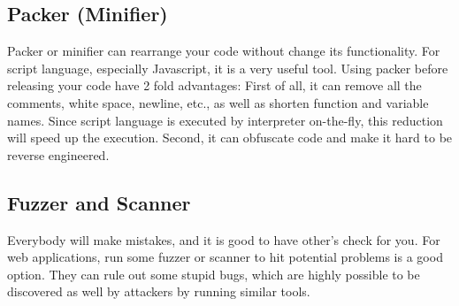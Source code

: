 \documentclass[conference]{IEEEtran}
\begin{document}
\subsection{Packer (Minifier)}
Packer or minifier can rearrange your code without change its
functionality.
For script language, especially Javascript, it is a very useful tool.
Using packer before releasing your code have 2 fold advantages:
First of all, it can remove all the comments, white space, newline, etc.,
as well as
shorten function and
variable names.
Since script language is executed by interpreter on-the-fly, this reduction
will speed up the execution.
Second, it can obfuscate code and make it hard to be reverse engineered.


\subsection{Fuzzer and Scanner}
Everybody will make mistakes, and it is good to have other's check for you.
For web applications, run some fuzzer or scanner to hit potential problems
is a good option.
They can rule out some stupid bugs, which are highly possible
to be discovered as well by attackers by running similar tools.




\end{document}
